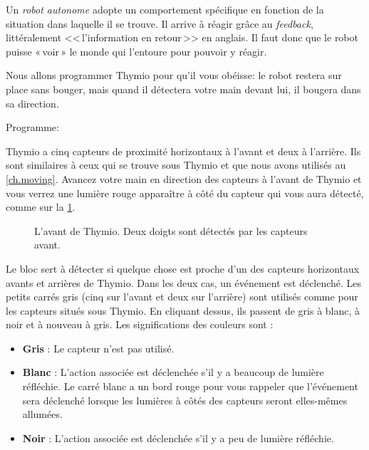\label{ch.pet}

Un \emph{robot autonome} adopte un comportement spécifique en fonction de la situation dans laquelle il se trouve.
Il arrive à réagir grâce au \textit{feedback}, littéralement <<\,l'information en retour\,>> en anglais.
Il faut donc que le robot puisse «\,voir\,» le monde qui l'entoure pour pouvoir y réagir.


Nous allons programmer Thymio pour qu'il vous obéisse:
le robot restera sur place sans bouger, mais quand il détectera votre main devant lui, il bougera dans sa direction.

{\raggedleft \hfill Programme: }

Thymio a cinq capteurs de proximité horizontaux à l'avant et deux à l'arrière.
Ils sont similaires à ceux qui se trouve sous Thymio et que nous avons utilisés au \cref{ch.moving}.
Avancez votre main en direction des capteurs à l'avant de Thymio et vous verrez une lumière rouge apparaître à côté du capteur qui vous aura détecté, comme sur la \cref{fig.detect}.

\begin{figure}
\begin{center}
\caption{L'avant de Thymio. Deux doigts sont détectés par les capteurs avant.}\label{fig.detect}
\end{center}
\end{figure}

Le bloc  sert à détecter si quelque chose est proche d'un des capteurs horizontaux avants et arrières de Thymio.
Dans les deux cas, un événement est déclenché.
Les petits carrés gris (cinq sur l'avant et deux sur l'arrière) sont utilisés comme pour les capteurs situés sous Thymio.
En cliquant dessus, ils passent de gris à blanc, à noir et à nouveau à gris.
Les significations des couleurs sont :

\begin{itemize}
\item \textbf{Gris} : Le capteur n'est pas utilisé.
\item \textbf{Blanc} : L'action associée est déclenchée s'il y a beaucoup de lumière réfléchie.
\label{p.proximity-colors2}
Le carré blanc a un bord rouge pour vous rappeler que l'événement sera déclenché lorsque les lumières à côtés des capteurs seront elles-mêmes allumées.
\item \textbf{Noir} : L'action associée est déclenchée s'il y a peu de lumière réfléchie.
\end{itemize}

